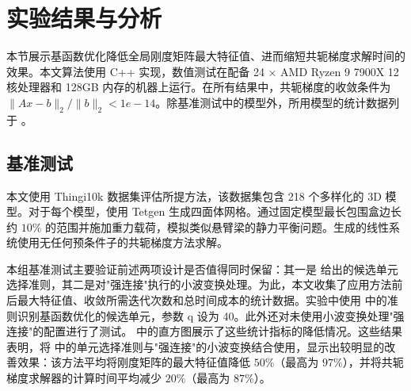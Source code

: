 \section{实验结果与分析}

本节展示基函数优化降低全局刚度矩阵最大特征值、进而缩短共轭梯度求解时间的效果。本文算法使用 C++ 实现，数值测试在配备 24 × AMD Ryzen 9 7900X 12 核处理器和 128GB 内存的机器上运行。在所有结果中，共轭梯度的收敛条件为 $\| Ax-b\|_2 / \|b\|_2 < 1e-14$。除基准测试中的模型外，所用模型的统计数据列于 。

\begin{table}[t]
  \setlength{\tabcolsep}{4pt}
  \caption[模型统计数据]{模型统计数据。其中，$\gamma$ 表示单元纵横比。}
  \label{p2:tab:statistics}
\end{table}

\subsection{基准测试}

本文使用 Thingi10k\cite{Thingi10K} 数据集评估所提方法，该数据集包含 218 个多样化的 3D 模型。对于每个模型，使用 Tetgen \cite{si_2015_tetgen} 生成四面体网格。通过固定模型最长包围盒边长约 $10\%$ 的范围并施加重力载荷，模拟类似悬臂梁的静力平衡问题。生成的线性系统使用无任何预条件子的共轭梯度方法求解。

本组基准测试主要验证前述两项设计是否值得同时保留：其一是  给出的候选单元选择准则，其二是对"强连接"执行的小波变换处理。为此，本文收集了应用方法前后最大特征值、收敛所需迭代次数和总时间成本的统计数据。实验中使用  中的准则识别基函数优化的候选单元，参数 q 设为 40。此外还对未使用小波变换处理"强连接"的配置进行了测试。 中的直方图展示了这些统计指标的降低情况。这些结果表明，将  中的单元选择准则与"强连接"的小波变换结合使用，显示出较明显的改善效果：该方法平均将刚度矩阵的最大特征值降低 $50\%$（最高为 $97\%$），并将共轭梯度求解器的计算时间平均减少 $20\%$（最高为 $87\%$）。

